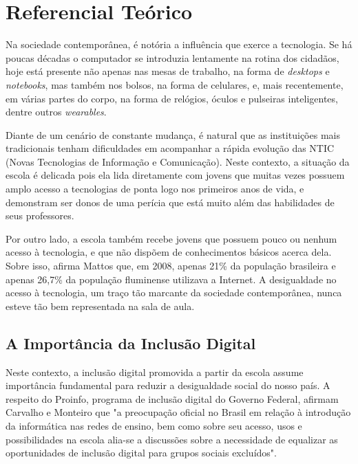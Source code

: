 \chapter{Referencial Teórico}\label{chp:LABEL_CHP_REF_TEO}

Na sociedade contemporânea, é notória a influência que exerce a tecnologia. Se há poucas décadas o computador se introduzia lentamente na rotina dos cidadãos, hoje está presente não apenas nas mesas de trabalho, na forma de \textit{desktops} e \textit{notebooks}, mas também nos bolsos, na forma de celulares, e, mais recentemente, em várias partes do corpo, na forma de relógios, óculos e pulseiras inteligentes, dentre outros \textit{wearables}.

Diante de um cenário de constante mudança, é natural que as instituições mais tradicionais tenham dificuldades em acompanhar a rápida evolução das NTIC (Novas Tecnologias de Informação e Comunicação). Neste contexto, a situação da escola é delicada pois ela lida diretamente com jovens que muitas vezes possuem amplo acesso a tecnologias de ponta logo nos primeiros anos de vida, e demonstram ser donos de uma perícia que está muito além das habilidades de seus professores.

Por outro lado, a escola também recebe jovens que possuem pouco ou nenhum acesso à tecnologia, e que não dispõem de conhecimentos básicos acerca dela. Sobre isso, afirma Mattos \cite{art:REF_ART_MATTOS} que, em 2008, apenas 21\% da população brasileira e apenas 26,7\% da população fluminense utilizava a Internet. A desigualdade no acesso à tecnologia, um traço tão marcante da sociedade contemporânea, nunca esteve tão bem representada na sala de aula.

\section{A Importância da Inclusão Digital}\label{sec:LABEL_CHP_REF_TEO_SEC_ID}

Neste contexto, a inclusão digital promovida a partir da escola assume importância fundamental para reduzir a desigualdade social do nosso país. A respeito do Proinfo, programa de inclusão digital do Governo Federal, afirmam Carvalho e Monteiro \cite{art:REF_ART_CARVALHO_MONTEIRO} que "a preocupação oficial no Brasil em relação à introdução da informática nas redes de ensino, bem como sobre seu acesso, usos e possibilidades na escola alia-se a discussões sobre a necessidade de equalizar as oportunidades de inclusão digital para grupos sociais excluídos".

